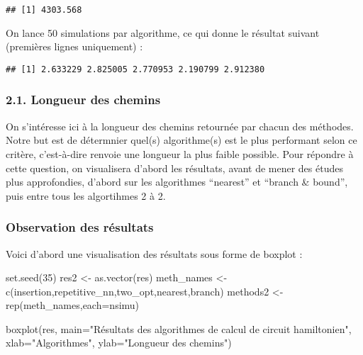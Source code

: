 \documentclass[
]{article}
\newenvironment{Shaded}{\begin{snugshade}}{\end{snugshade}}
\newcommand{\AttributeTok}[1]{\textcolor[rgb]{0.77,0.63,0.00}{#1}}
\newcommand{\DecValTok}[1]{\textcolor[rgb]{0.00,0.00,0.81}{#1}}
\newcommand{\FunctionTok}[1]{\textcolor[rgb]{0.00,0.00,0.00}{#1}}
\newcommand{\NormalTok}[1]{#1}
\newcommand{\OtherTok}[1]{\textcolor[rgb]{0.56,0.35,0.01}{#1}}
\newcommand{\StringTok}[1]{\textcolor[rgb]{0.31,0.60,0.02}{#1}}
\begin{document}
\begin{verbatim}
## [1] 4303.568
\end{verbatim}

On lance 50 simulations par algorithme, ce qui donne le résultat suivant
(premières lignes uniquement) :

\begin{verbatim}
## [1] 2.633229 2.825005 2.770953 2.190799 2.912380
\end{verbatim}

\hypertarget{longueur-des-chemins}{%
\subsubsection{2.1. Longueur des chemins}\label{longueur-des-chemins}}

On s'intéresse ici à la longueur des chemins retournée par chacun des
méthodes. Notre but est de détermnier quel(s) algorithme(s) est le plus
performant selon ce critère, c'est-à-dire renvoie une longueur la plus
faible possible. Pour répondre à cette question, on visualisera d'abord
les résultats, avant de mener des études plus approfondies, d'abord sur
les algorithmes ``nearest'' et ``branch \& bound'', puis entre tous les
algortihmes 2 à 2.

\hypertarget{observation-des-ruxe9sultats}{%
\subsubsection{Observation des
résultats}\label{observation-des-ruxe9sultats}}

Voici d'abord une visualisation des résultats sous forme de boxplot :

\begin{Shaded}
\begin{Highlighting}[]
\FunctionTok{set.seed}\NormalTok{(}\DecValTok{35}\NormalTok{)}
\NormalTok{res2 }\OtherTok{\textless{}{-}} \FunctionTok{as.vector}\NormalTok{(res)}
\NormalTok{meth\_names }\OtherTok{\textless{}{-}} \FunctionTok{c}\NormalTok{(}\StringTok{\textquotesingle{}insertion\textquotesingle{}}\NormalTok{,}\StringTok{\textquotesingle{}repetitive\_nn\textquotesingle{}}\NormalTok{,}\StringTok{\textquotesingle{}two\_opt\textquotesingle{}}\NormalTok{,}\StringTok{\textquotesingle{}nearest\textquotesingle{}}\NormalTok{,}\StringTok{\textquotesingle{}branch\textquotesingle{}}\NormalTok{)}
\NormalTok{methods2 }\OtherTok{\textless{}{-}} \FunctionTok{rep}\NormalTok{(meth\_names,}\AttributeTok{each=}\NormalTok{nsimu) }

\FunctionTok{boxplot}\NormalTok{(res,}
        \AttributeTok{main=}\StringTok{"Résultats des algorithmes de calcul de circuit hamiltonien"}\NormalTok{,}
        \AttributeTok{xlab=}\StringTok{"Algorithmes"}\NormalTok{,}
        \AttributeTok{ylab=}\StringTok{"Longueur des chemins"}\NormalTok{)}
\end{Highlighting}
\end{Shaded}
\end{document}
